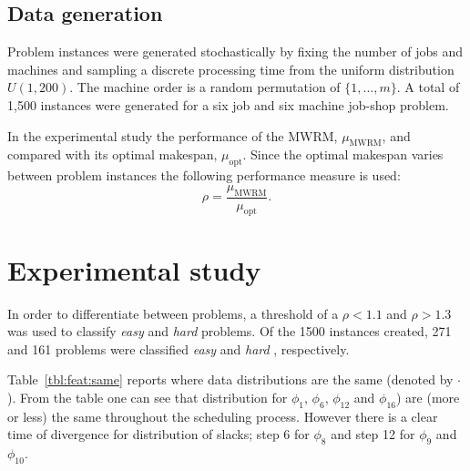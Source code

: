 \documentclass[10pt]{llncs} %
\newcommand{\hard}{\emph{hard} }
\newcommand{\easy}{\emph{easy} }
\begin{document}
\subsection{Data generation}

Problem instances were generated stochastically by fixing the number of jobs and machines and sampling a discrete processing time from the uniform distribution $U(1,200)$. The machine order is a random permutation of $\{1,...,m\}$. A total of 1,500 instances were generated for a six job and six machine job-shop problem. 


In the experimental study the performance of the MWRM, $\mu_{\text{MWRM}}$, and compared with its optimal makespan, $\mu_{\text{opt}}$. Since the optimal makespan varies between problem instances the following performance measure is used:
\begin{equation}\label{eq:ratio}\rho=\frac{\mu_{\text{MWRM}}}{\mu_{\text{opt}}}.\end{equation}





\section{Experimental study}\label{sec:expr}
In order to differentiate between problems, a threshold of a $\rho<1.1$ and $\rho>1.3$ was used to classify \easy and \hard problems.
Of the 1500 instances created, 271 and 161 problems were classified \easy and \hard\!, respectively.

Table~\ref{tbl:feat:same} reports where data distributions are the same (denoted by $\cdot$).
From the table one can see that distribution for $\phi_1$, $\phi_6$, $\phi_{12}$ and $\phi_{16}$) are (more or less) the same throughout the scheduling process. 
However there is a clear time of divergence for distribution of slacks; step 6 for $\phi_8$ and step 12 for $\phi_9$ and $\phi_{10}$. 
\end{document}
